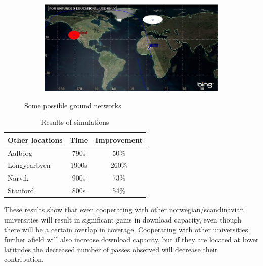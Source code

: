 \begin{figure}
\begin{subfigure}{.5\textwidth}
	\label{fig:range_ntnu_narvik}
\end{subfigure}
\begin{subfigure}{.5\textwidth}
	\centering
	\includegraphics[width=\textwidth]{Figures/range_ntnu_stanford}
	\label{fig:range_ntnu_narvik}
\end{subfigure}
\caption{Some possible ground networks}
\label{fig:ground_networks}
\end{figure}

\begin{table}
	\begin{center}
	\begin{tabular}{l | c c}
  	Other locations & Time & Improvement \\
	\hline \hline
	Aalborg & 790s &  50\% \\
	\hline
	Longyearbyen & 1900s & 260\% \\
	\hline
	Narvik & 900s & 73\%  \\
	\hline
	Stanford & 800s & 54\% 
	\end{tabular}
	\end{center}
	\caption{Results of simulations}
	\label{tab:networks}
\end{table}

These results show that even cooperating with other norwegian/scandinavian universities will result in significant gains in download capacity, even though there will be a certain overlap in coverage. Cooperating with other universities further afield will also increase download capacity, but if they are located at lower latitudes the decreased number of passes observed will decrease their contribution.  


